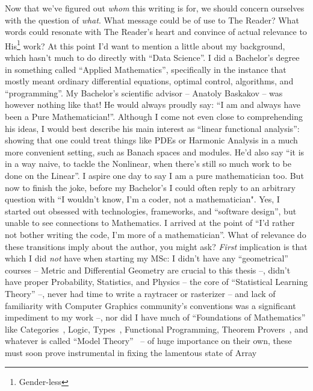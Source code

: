 Now that we've figured out \emph{whom} this writing is for, we should concern
ourselves with the question of \emph{what}. What message could be of use to The
Reader? What words could resonate with The Reader's heart and convince of
actual relevance to His\footnote{Gender-less} work?  At this point
I'd want to mention a little about my background, which hasn't much to do
directly with ``Data Science''. I did a Bachelor's degree in something called
``Applied Mathematics'', specifically in the instance that mostly meant
ordinary differential equations, optimal control, algorithms, and
``programming''. My Bachelor's scientific advisor -- Anatoly Baskakov -- was
however nothing like that! He would always proudly say: ``I am and always have
been a Pure Mathematician!''.  Although I come not even close to comprehending
his ideas, I would best describe his main interest as ``linear functional
analysis'': showing that one could treat things like PDEs or Harmonic Analysis
in a much more convenient setting, such as Banach spaces and modules. He'd also
say ``it is in a way naive, to tackle the Nonlinear, when there's still so much
work to be done on the Linear''. I aspire one day to say I am a pure
mathematician too.  But now to finish the joke, before my Bachelor's I could
often reply to an arbitrary question with ``I wouldn't know, I'm a coder, not a
mathematician".  Yes, I started out obsessed with technologies, frameworks, and
``software design'', but unable to see connections to Mathematics. I arrived at
the point of ``I'd rather not bother writing the code, I'm more of a
mathematician''. What of relevance do these transitions imply about the author,
you might ask?  \emph{First} implication is that which I did \emph{not} have
when starting my MSc:  I didn't have any ``geometrical'' courses -- Metric and
Differential Geometry are crucial to this thesis --, didn't have proper
Probability, Statistics, and Physics -- the core of ``Statistical Learning
Theory'' --, never had time to write a raytracer or rasterizer -- and lack of
familiarity with Computer Graphics community's conventions was a significant
impediment to my work --, nor did I have much of ``Foundations of Mathematics''
like Categories~\citep{categoriesWorking,goldblattTopoi,distributiveLawvere,categoryTheoreticUniversalAlgebra}, Logic,
Types~\cite{thinkingWithTypes}, Functional
Programming, Theorem Provers~\citep{coq,lean,buzzardLean}, and whatever is called ``Model
Theory''~\citep{marker2006model} -- of huge importance on their own, these must
soon prove instrumental in fixing the lamentous state of Array
